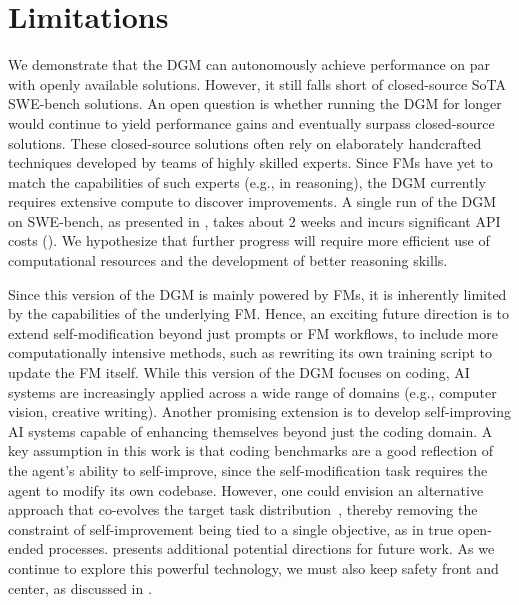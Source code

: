 \section{Limitations}
\label{sec:limitations}


We demonstrate that the DGM can autonomously achieve performance on par with openly available solutions. However, it still falls short of closed-source SoTA SWE-bench solutions. An open question is whether running the DGM for longer would continue to yield performance gains and eventually surpass closed-source solutions. These closed-source solutions often rely on elaborately handcrafted techniques developed by teams of highly skilled experts. Since FMs have yet to match the capabilities of such experts (e.g., in reasoning), the DGM currently requires extensive compute to discover improvements. A single run of the DGM on SWE-bench, as presented in , takes about 2 weeks and incurs significant API costs (). We hypothesize that further progress will require more efficient use of computational resources and the development of better reasoning skills.

Since this version of the DGM is mainly powered by FMs, it is inherently limited by the capabilities of the underlying FM. Hence, an exciting future direction is to extend self-modification beyond just prompts or FM workflows, to include more computationally intensive methods, such as rewriting its own training script to update the FM itself. While this version of the DGM focuses on coding, AI systems are increasingly applied across a wide range of domains (e.g., computer vision, creative writing). Another promising extension is to develop self-improving AI systems capable of enhancing themselves beyond just the coding domain. A key assumption in this work is that coding benchmarks are a good reflection of the agent's ability to self-improve, since the self-modification task requires the agent to modify its own codebase. However, one could envision an alternative approach that co-evolves the target task distribution~\citep{faldor2025omni, wang2023robogen}, thereby removing the constraint of self-improvement being tied to a single objective, as in true open-ended processes.  presents additional potential directions for future work. As we continue to explore this powerful technology, we must also keep safety front and center, as discussed in .
